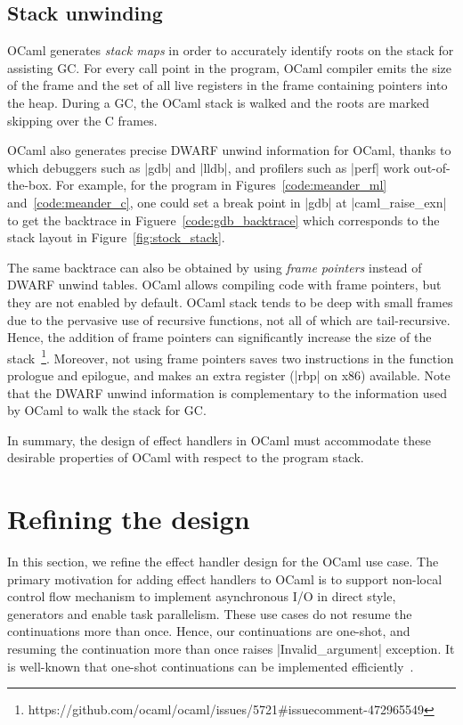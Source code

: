 \documentclass[sigplan,10pt,review,anonymous]{acmart}\settopmatter{printfolios=true,printccs=false,printacmref=false}
\begin{document}
\subsection{Stack unwinding}
\label{sec:unwind}

OCaml generates \emph{stack maps} in order to accurately identify roots on the
stack for assisting GC. For every call point in the program, OCaml compiler
emits the size of the frame and the set of all live registers in the frame
containing pointers into the heap. During a GC, the OCaml stack is walked and
the roots are marked skipping over the C frames.

OCaml also generates precise DWARF unwind information for OCaml, thanks to
which debuggers such as |gdb| and |lldb|, and profilers such as |perf| work
out-of-the-box. For example, for the program in Figures~\ref{code:meander_ml}
and~\ref{code:meander_c}, one could set a break point in |gdb| at
|caml_raise_exn| to get the backtrace in Figuere~\ref{code:gdb_backtrace} which
corresponds to the stack layout in Figure~\ref{fig:stock_stack}.

The same backtrace can also be obtained by using \emph{frame pointers} instead
of DWARF unwind tables. OCaml allows compiling code with frame pointers, but
they are not enabled by default. OCaml stack tends to be deep with small frames
due to the pervasive use of recursive functions, not all of which are
tail-recursive. Hence, the addition of frame pointers can significantly
increase the size of the
stack~\footnote{https://github.com/ocaml/ocaml/issues/5721\#issuecomment-472965549}.
Moreover, not using frame pointers saves two instructions in the function
prologue and epilogue, and makes an extra register (|rbp| on x86) available.
Note that the DWARF unwind information is complementary to the information used
by OCaml to walk the stack for GC.

In summary, the design of effect handlers in OCaml must accommodate these
desirable properties of OCaml with respect to the program stack.

\section{Refining the design}
\label{sec:refine}

In this section, we refine the effect handler design for the OCaml use case.
The primary motivation for adding effect handlers to OCaml is to support
non-local control flow mechanism to implement asynchronous I/O in direct style,
generators and enable task parallelism. These use cases do not resume the
continuations more than once. Hence, our continuations are one-shot, and
resuming the continuation more than once raises |Invalid_argument| exception.
It is well-known that one-shot continuations can be implemented
efficiently~\cite{Bruggeman96RepresentingControl}.
\end{document}
